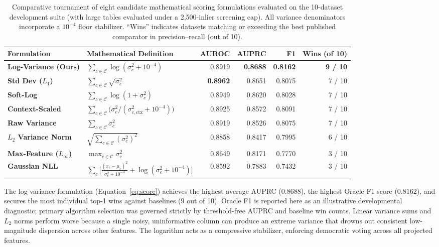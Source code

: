 \documentclass{article}
\begin{document}
\begin{table}[h]
\centering
\caption{Comparative tournament of eight candidate mathematical scoring formulations evaluated on the 10-dataset development suite (with large tables evaluated under a 2,500-inlier screening cap). All variance denominators incorporate a $10^{-4}$ floor stabilizer. ``Wins'' indicates datasets matching or exceeding the best published comparator in precision--recall (out of 10).}
\label{tab:tournament}
\footnotesize
\setlength{\tabcolsep}{3.2pt}
\begin{tabular}{llrrrr}
\toprule
Formulation & Mathematical Definition & AUROC & AUPRC & F1 & Wins (of 10) \\
\midrule
\textbf{Log-Variance (Ours)} & $\sum_{c \in \mathcal{C}} \log(\sigma_c^2 + 10^{-4})$ & 0.8919 & \textbf{0.8688} & \textbf{0.8162} & \textbf{9 / 10} \\
\textbf{Std Dev ($L_1$)} & $\sum_{c \in \mathcal{C}} \sqrt{\sigma_c^2}$ & \textbf{0.8962} & 0.8651 & 0.8075 & 7 / 10 \\
\textbf{Soft-Log} & $\sum_{c \in \mathcal{C}} \log(1 + \sigma_c^2)$ & 0.8949 & 0.8620 & 0.8028 & 7 / 10 \\
\textbf{Context-Scaled} & $\sum_{c \in \mathcal{C}} \bigl(\sigma_c^2 / (\sigma_{c,\text{ctx}}^2 + 10^{-4})\bigr)$ & 0.8925 & 0.8572 & 0.8091 & 7 / 10 \\
\textbf{Raw Variance} & $\sum_{c \in \mathcal{C}} \sigma_c^2$ & 0.8919 & 0.8526 & 0.8075 & 7 / 10 \\
\textbf{$L_2$ Variance Norm} & $\sqrt{\sum_{c \in \mathcal{C}} (\sigma_c^2)^2}$ & 0.8858 & 0.8417 & 0.7995 & 6 / 10 \\
\textbf{Max-Feature ($L_\infty$)} & $\max_{c \in \mathcal{C}} \sigma_c^2$ & 0.8649 & 0.8171 & 0.7770 & 3 / 10 \\
\textbf{Gaussian NLL} & $\sum_{c} \bigl[\frac{(x_c - \mu_c)^2}{\sigma_c^2 + 10^{-4}} + \log(\sigma_c^2 + 10^{-4})\bigr]$ & 0.8592 & 0.7883 & 0.7432 & 3 / 10 \\
\bottomrule
\end{tabular}
\end{table}

The log-variance formulation (Equation~\ref{eq:score}) achieves the highest average AUPRC ($0.8688$), the highest Oracle F1 score ($0.8162$), and secures the most individual top-1 wins against baselines (9 out of 10). Oracle F1 is reported here as an illustrative developmental diagnostic; primary algorithm selection was governed strictly by threshold-free AUPRC and baseline win counts. Linear variance sums and $L_2$ norms perform worse because a single noisy, uninformative column can produce an extreme variance that drowns out consistent low-magnitude dispersion across other features. The logarithm acts as a compressive stabilizer, enforcing democratic voting across all projected features.
\end{document}
